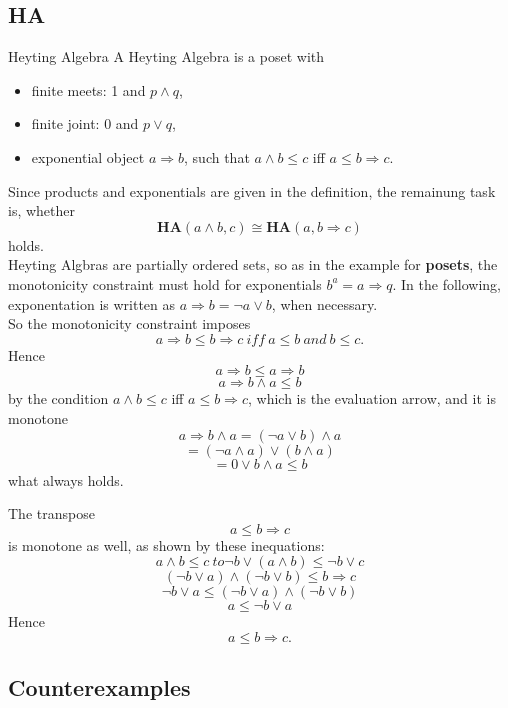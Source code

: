  \subsection{\textbf{HA}}
\begin{definition}{Heyting Algebra}
  A Heyting Algebra is a poset with
  \begin{itemize}
  \item finite meets: 1 and $p \land q$,
  \item finite joint: 0 and $p \lor q$,
  \item exponential object $a \Rightarrow b$, such that $a \land b \leq c$ iff $a \leq b \Rightarrow c$.
  \end{itemize}

\end{definition}
Since products and exponentials are given in the definition, the remainung task is, whether
 $$\textbf{HA}(a \land b, c) \cong \textbf{HA}(a, b \Rightarrow c)$$ holds.
\\
Heyting Algbras are partially ordered sets, so as in the example for \textbf{posets}, the monotonicity constraint must hold for exponentials $b^a= a \Rightarrow q$.
In the following, exponentation is written as $a \Rightarrow b = \neg a \lor b$, when necessary.
\\
So the monotonicity constraint imposes $$ a \Rightarrow b \leq b \Rightarrow c \ iff \ a \leq b \ and \ b \leq c.$$
Hence $$a \Rightarrow b  \leq a \Rightarrow b$$
$$ a \Rightarrow b \land a \leq b$$ by the condition $a \land b \leq c$ iff $a \leq b \Rightarrow c$, which is the evaluation arrow, and it is monotone
$$ a \Rightarrow b \land a = (\neg a \lor b) \land a$$
$$ = (\neg a \land a) \lor (b \land a)$$
$$ = 0 \lor b \land a \leq b$$ what always holds.

The transpose $$a\leq b \Rightarrow c $$ is monotone as well, as shown by these inequations:
$$ a \land b \leq c \ to \neg b \lor (a \land b) \leq \neg b \lor c $$
$$ (\neg b \lor a) \land (\neg b \lor b) \leq b \Rightarrow c$$
$$ \neg b \lor a \leq (\neg b \lor a) \land (\neg b \lor b) $$
$$ a \leq \neg b \lor a$$
Hence
$$ a \leq b \Rightarrow c.
$$
\subsection{Counterexamples}

